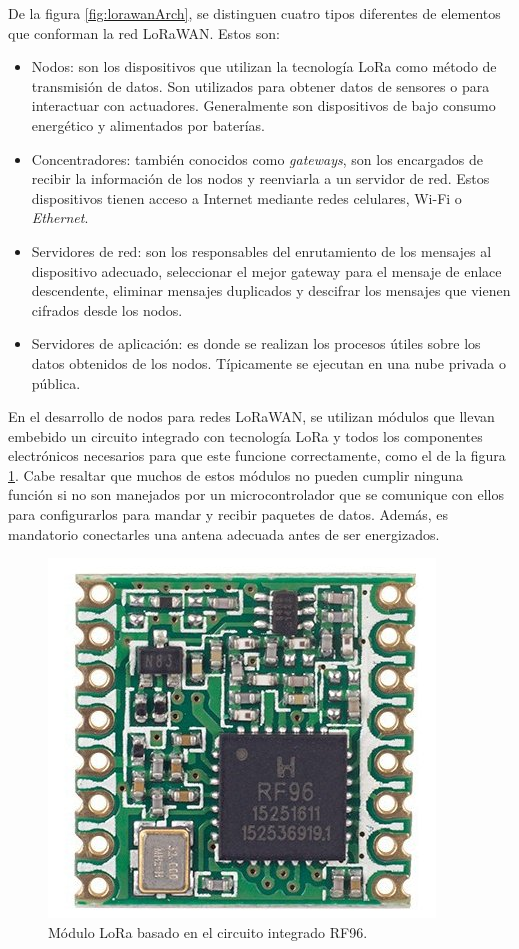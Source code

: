 De la figura \ref{fig:lorawanArch}, se distinguen cuatro tipos diferentes de elementos que conforman la red LoRaWAN. Estos son:

\begin{itemize}
	\item Nodos: son los dispositivos que utilizan la tecnología LoRa como método de transmisión de datos. Son utilizados para obtener datos de sensores o para interactuar con actuadores. Generalmente son dispositivos de bajo consumo energético y alimentados por baterías.
	\item Concentradores: también conocidos como \textit{gateways}, son los encargados de recibir la información de los nodos y reenviarla a un servidor de red. Estos dispositivos tienen acceso a Internet mediante redes celulares, Wi-Fi o \textit{Ethernet}.
	\item Servidores de red: son los responsables del enrutamiento de los mensajes al dispositivo adecuado, seleccionar el mejor gateway para el mensaje de enlace descendente, eliminar mensajes duplicados y descifrar los mensajes que vienen cifrados desde los nodos.
	\item Servidores de aplicación: es donde se realizan los procesos útiles sobre los datos obtenidos de los nodos. Típicamente se ejecutan en una nube privada o pública.
\end{itemize}

En el desarrollo de nodos para redes LoRaWAN, se utilizan módulos que llevan embebido un circuito integrado con tecnología LoRa y todos los componentes electrónicos necesarios para que este funcione correctamente, como el de la figura \ref{fig:rf96}. Cabe resaltar que muchos de estos módulos no pueden cumplir ninguna función si no son manejados por un microcontrolador que se comunique con ellos para configurarlos para mandar y recibir paquetes de datos. Además, es mandatorio conectarles una antena adecuada antes de ser energizados.
\begin{figure}[h]
	\centering
	\includegraphics[scale=0.3]{./Figures/lora_module.jpg}
	\caption{Módulo LoRa basado en el circuito integrado RF96\protect\footnotemark.}
	\label{fig:rf96}
\end{figure}

